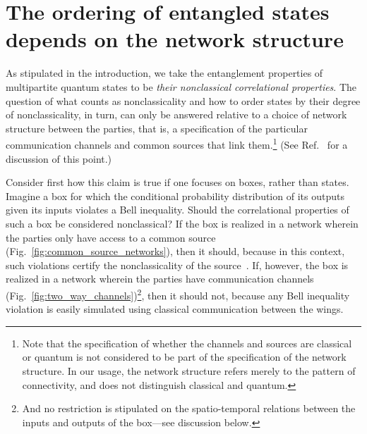 \documentclass[12pt]{article}
\theoremstyle{plain}
\theoremstyle{definition}
\begin{document}
\section{The ordering of entangled states depends on the network structure}\label{NetworkStructure}

As stipulated in the introduction, we take the entanglement properties of multipartite quantum states to be {\em their nonclassical correlational properties}. 
  The question of 
what counts as nonclassicality and how to order states by their degree of nonclassicality,
 in turn,  can only be answered relative to a choice of network structure between the parties, that is, a specification of 
 the particular communication channels and common sources that link them.\footnote{Note that the specification of whether the channels and sources are classical or quantum  is not considered to be part of the specification of the network structure.  In our usage, the network structure refers merely to the pattern of connectivity, and does not distinguish classical and quantum. } (See Ref.~\cite{wolfe2020quantifying} for a discussion of this point.)

Consider first how this claim is true if one focuses on boxes, rather than states.
Imagine a box for which the conditional probability distribution of its outputs given its inputs violates a Bell inequality.  Should the correlational properties of such a box be considered nonclassical?   If the box is realized in a network wherein the parties only have access to a common source (Fig.~\ref{fig:common_source_networks}), then it should, because in this context, such violations certify the nonclassicality of the source~\cite{Wood2015}.  If, however, the box is realized in a network wherein the parties have communication channels  (Fig.~\ref{fig:two_way_channels})\footnote{And no restriction is stipulated on the spatio-temporal relations between the inputs and outputs of the box---see discussion below.}, then it should not, because any Bell inequality violation is easily simulated using classical communication between the wings.
\end{document}
